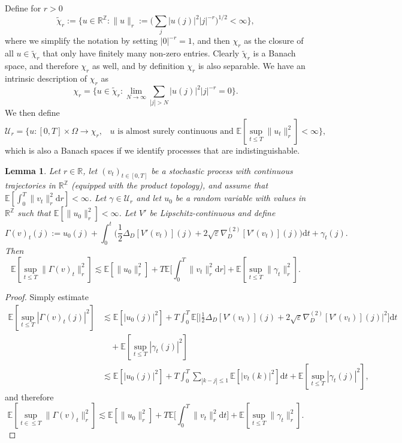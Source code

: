 \documentclass[11pt, a4paper]{article}
\newcommand{\assign}{:=}
\newcommand{\mathd}{\mathrm{d}}
\newtheorem{lemma}[theorem]{Lemma}
\newcommand{\1}{\mathbf{1}}
\begin{document}
Define for $r > 0$
\[ \tilde{\chi}_r \assign \Big\{ u \in \mathbb{R}^{\mathbb{Z}} : \| u \|_r
   \assign \Big( \sum_j | u (j) |^2 | j |^{- r} \Big)^{1 / 2} < \infty
   \Big\}, \]
where we simplify the notation by setting $| 0 |^{- r} = 1$, and then $\chi_r$
as the closure of all $u \in \tilde{\chi}_r$ that only have finitely many
non-zero entries. Clearly $\tilde{\chi}_r$ is a Banach space, and therefore
$\chi_r$ as well, and by definition $\chi_r$ is also separable. We have an
intrinsic description of $\chi_r$ as
\[ \chi_r = \Big\{ u \in \tilde{\chi}_r : \lim_{N \rightarrow \infty} \sum_{|
   j | > N} | u (j) |^2 | j |^{- r} = 0 \Big\} . \]
We then define
\[ \mathcal{U}_r = \Big\{ u : [0, T] \times \Omega \rightarrow \chi_r,
   \hspace{10pt} u \text{ is almost surely continuous and } \mathbb{E} [\sup_{t \leqslant T} \| u_t \|_r^2] < \infty
   \Big\}, \]
which is also a Banach spaces if we identify processes that are
indistinguishable.

\begin{lemma}\label{lem:picard}
  Let $r \in \mathbb{R}$, let $(v_t)_{t \in [0, T]}$ be a
  stochastic process with continuous trajectories in
  $\mathbb{R}^{\mathbb{Z}}$ (equipped with the product topology), and assume that
  $\mathbb{E} [ \int_0^T \| v_t \|_r^2 \mathd r ] < \infty$. Let
  $\gamma \in \mathcal{U}_r$ and let $u_0$ be a random variable with values in
  $\mathbb{R}^{\mathbb{Z}}$ such that $\mathbb{E} [\| u_0 \|_r^2] <
  \infty$. Let $V'$ be Lipschitz-continuous and define
  \[ \Gamma (v)_t (j) \assign u_0 (j) + \int_0^t \Big( \frac{1}{2} \Delta_D
     [V' (v_t)] (j) + 2 \sqrt{\varepsilon} \nabla^{(2)}_D [V' (v_t)] (j)
     \Big) \mathd t + \gamma_t (j) . \]
  Then
  \[ \mathbb{E} [\sup_{t \leqslant T} \| \Gamma (v)_t \|_r^2] \lesssim
     \mathbb{E} [\| u_0 \|_r^2] + T\mathbb{E} \Big[ \int_0^T \| v_t \|_r^2
     \mathd r \Big] +\mathbb{E} [\sup_{t \leqslant T} \| \gamma_t \|_r^2] .
  \]
\end{lemma}

\begin{proof}
  Simply estimate
  \begin{align*}
   \mathbb{E} [\sup_{t \leqslant T} | \Gamma (v)_t (j) |^2]
   &\lesssim
   \mathbb{E} [| u_0 (j) |^2] + T \int_0^T \mathbb{E} \Big[ \Big|
   \frac{1}{2} \Delta_D [V' (v_t)] (j) + 2 \sqrt{\varepsilon} \nabla^{(2)}_D
   [V' (v_t)] (j) \Big|^2 \Big] \mathd t \\
   & \quad +\mathbb{E} [\sup_{t \leqslant T} | \gamma_t (j) |^2] \\
   &\lesssim \mathbb{E} [| u_0 (j) |^2] + T \int_0^T \sum_{| k - j |
   \leqslant 1} \mathbb{E} [| v_t (k) |^2] \mathd t +\mathbb{E} [\sup_{t
   \leqslant T} | \gamma_t (j) |^2],
  \end{align*}
  and therefore
  \[ \mathbb{E} [\sup_{t \in \leqslant T} \| \Gamma (v)_t \|_r^2] \lesssim
     \mathbb{E} [\| u_0 \|_r^2] + T\mathbb{E} \Big[ \int_0^T \| v_t \|_r^2
     \mathd t \Big] +\mathbb{E} [\sup_{t \leqslant T} \| \gamma_t \|_r^2] .
  \]
  
\end{proof}
\end{document}
